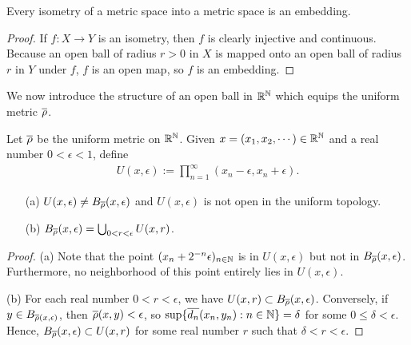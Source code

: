 \begin{obs}
    Every isometry of a metric space into a metric space is an embedding.
\end{obs}
\begin{proof}
    If $f: X\rightarrow Y$ is an isometry, then $f$ is clearly injective and continuous.
    Because an open ball of radius $r>0$ in $X$ is mapped onto an open ball of radius $r$ in $Y$ under $f$, $f$ is an open map, so $f$ is an embedding.
\end{proof}

We now introduce the structure of an open ball in ${\mathbb{R}}^{\mathbb{N}}$ which equips the uniform metric $\overline{\rho}$.
\begin{prop}
    Let $\overline{\rho}$ be the uniform metric on ${\mathbb{R}}^{\mathbb{N}}$.
    Given $x=(x_1, x_2, \cdots)\in{\mathbb{R}}^{\mathbb{N}}$ and a real number $0<\epsilon<1$, define
    \begin{align*}
        U(x, \epsilon):=\prod_{n=1}^\infty (x_n-\epsilon, x_n+\epsilon).
    \end{align*}
    \begin{enumerate}
        \item[(a)]
        {
            $U(x, \epsilon)\neq B_{\overline{\rho}}(x, \epsilon)$ and $U(x, \epsilon)$ is not open in the uniform topology.
        }
        \item[(b)]
        {
            $B_{\overline{\rho}}(x, \epsilon)=\bigcup_{0<r<\epsilon} U(x, r)$.
        }
    \end{enumerate}
\end{prop}
\begin{proof}
    \hangindent=0.65cm
    (a)
    Note that the point $(x_n+2^{-n}\epsilon)_{n\in{\mathbb{N}}}$ is in $U(x, \epsilon)$ but not in $B_{\overline{\rho}}(x, \epsilon)$.
    Furthermore, no neighborhood of this point entirely lies in $U(x, \epsilon)$.
    
    \noindent(b)
    For each real number $0<r<\epsilon$, we have $U(x, r)\subset B_{\overline{\rho}}(x, \epsilon)$.
    Conversely, if $y\in B_{\overline{\rho}(x, \epsilon)}$, then $\overline{\rho}(x, y)<\epsilon$, so $\sup\{\overline{d_n}(x_n, y_n): n\in{\mathbb{N}}\}=\delta$ for some $0\leq\delta<\epsilon$.
    Hence, $B_{\overline{\rho}}(x, \epsilon)\subset U(x, r)$ for some real number $r$ such that $\delta<r<\epsilon$.
\end{proof}